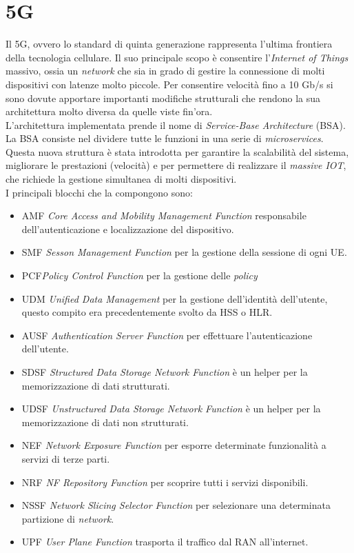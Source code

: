 \clearpage

\section{5G}
Il 5G, ovvero lo standard di quinta generazione rappresenta l'ultima frontiera della tecnologia cellulare.
Il suo principale scopo è consentire l'\textit{Internet of Things} massivo, ossia un \textit{network} che sia 
in grado di gestire la connessione di molti dispositivi con latenze molto piccole.
Per consentire velocità fino a 10 Gb/s si sono
dovute apportare importanti modifiche strutturali che rendono la sua architettura molto diversa da quelle viste fin'ora.\\
L'architettura implementata prende il nome di \textit{Service-Base Architecture} (BSA).
La BSA consiste nel dividere tutte le funzioni in una serie di \textit{microservices}\cite{5g-approach}. 
Questa nuova struttura è stata introdotta per garantire la scalabilità del sistema, migliorare le prestazioni (velocità) e per 
permettere di realizzare il \textit{massive IOT}, che richiede la gestione simultanea di molti dispositivi.\\
I principali blocchi che la compongono sono:
\begin{itemize}
    \item AMF \textit{Core Access and Mobility Management Function} responsabile dell'autenticazione e localizzazione del dispositivo.
    \item SMF \textit{Sesson Management Function} per la gestione della sessione di ogni UE.
    \item PCF\textit{Policy Control Function} per la gestione delle \textit{policy}
    \item UDM \textit{Unified Data Management} per la gestione dell'identità dell'utente, questo compito era precedentemente svolto da HSS o HLR.
    \item AUSF \textit{Authentication Server Function} per effettuare l'autenticazione dell'utente.
    \item SDSF \textit{Structured Data Storage Network Function} è un helper per la memorizzazione di dati strutturati.
    \item UDSF \textit{Unstructured Data Storage Network Function} è un helper per la memorizzazione di dati non strutturati.
    \item NEF \textit{Network Exposure Function} per esporre determinate funzionalità a servizi di terze parti.
    \item NRF \textit{NF Repository Function} per scoprire tutti i servizi disponibili.
    \item NSSF \textit{Network Slicing Selector Function} per selezionare una determinata partizione di \textit{network}.
    \item UPF \textit{User Plane Function} trasporta il traffico dal RAN all'internet.
\end{itemize}
